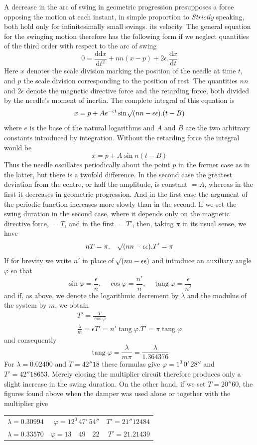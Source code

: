 A decrease in the arc of swing in geometric progression presupposes a force opposing the motion at each instant, in simple proportion to
\expandafter\def\csname HistoricalNoteText395\endcsname{\textit{Strictly} speaking, both hold only for infinitesimally small swings.}%
its velocity. The general equation for the swinging motion therefore has the following form if we neglect quantities of the third order with respect to the arc of swing
\[
0=\frac{\mathrm{d}\mathrm{d}x}{\mathrm{d}t^2}+nn(x-p)+2\epsilon.\frac{\mathrm{d}x}{\mathrm{d}t}
\]
Here $x$ denotes the scale division marking the position of the needle at time $t$, and $p$ the scale division corresponding to the position of rest. The quantities $nn$ and $2\epsilon$ denote the magnetic directive force and the retarding force, both divided by the needle’s moment of inertia. The complete integral of this equation is
\[
x=p+Ae^{-\epsilon t}\sin\mathord{{}^{}\!\surd}(nn-\epsilon\epsilon).(t-B)
\]
where $e$ is the base of the natural logarithms and $A$ and $B$ are the two arbitrary constants introduced by integration. Without the retarding force the integral would be
\[
x=p+A\sin n(t-B)
\]
Thus the needle oscillates periodically about the point $p$ in the former case as in the latter, but there is a twofold difference. In the second case the greatest deviation from the centre, or half the amplitude, is constant $=A$, whereas in the first it decreases in geometric progression. And in the first case the argument of the periodic function increases more slowly than in the second. If we set the swing duration in the second case, where it depends only on the magnetic directive force, $=T$, and in the first $=T'$, then, taking $\pi$ in its usual sense, we have
\[
nT=\pi,\quad \mathord{{}^{}\!\surd}(nn-\epsilon\epsilon).T'=\pi
\]
If for brevity we write $n'$ in place of $\mathord{{}^{}\!\surd}(nn-\epsilon\epsilon)$ and introduce an auxiliary angle $\varphi$ so that
\[
\sin\varphi=\frac{\epsilon}{n},\quad \cos\varphi=\frac{n'}{n},\quad \operatorname{tang}\varphi=\frac{\epsilon}{n'}
\]
and if, as above, we denote the logarithmic decrement by $\lambda$ and the modulus of the system by
$m$, we obtain
\[
\begin{gathered}
T'=\frac{T}{\cos\varphi}\\
\frac{\lambda}{m}=\epsilon T'=n'\operatorname{tang}\varphi.T'=\pi\operatorname{tang}\varphi
\end{gathered}
\]
and consequently
\[
\operatorname{tang}\varphi=\frac{\lambda}{m\pi}=\frac{\lambda}{1.364376}
\]
For $\lambda=0.02400$ and $T=42''18$ these formulas give $\varphi=1^0\,0'\,28''$ and $T'=42''18653$. Merely closing the multiplier circuit therefore produces only a slight increase in the swing duration. On the other hand, if we set $T=20''60$, the figures found above when the damper was used alone or together with the multiplier give
\begin{center}
\begin{tabular}{r|r|r}
$\lambda=0.30994$&$\varphi=12^0\,47'\,54''$&$T'=21''12484$\\
$\lambda=0.33570$&$\varphi=13\quad49\quad22$&$T'=21.21439$
\end{tabular}
\end{center}


